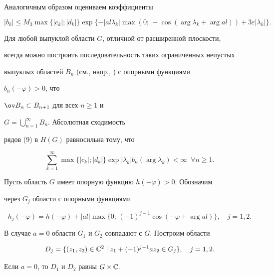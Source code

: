 Аналогичным образом оцениваем коэффициенты 


$$ 


|b_k|\le M_3\max\{|c_k|;|d_k|\}\exp 


\{-|al\lambda_k|\max(0;\,-\cos(\arg\lambda_k+\arg al))+ 


3\varepsilon|\lambda_k|\}. 


$$ 


 


Для любой выпуклой области $G$, отличной от расширенной плоскости, 


всегда можно построить последовательность таких ограниченных непустых 


выпуклых областей $B_n$ (см., напр., \cite{5}) с опорными функциями 


$b_n(-\varphi)>0$, что 


$\ov B_n\subset B_{n+1}$ для всех $n\ge 1$ и 


$G=\bigcup\limits^\infty_{n=1}B_n$. Абсолютная сходимость 


рядов (9) в $H(G)$ равносильна тому, что 


\begin{equation} 


\sum^\infty_{k=1}\max\{|c_k|;|d_k|\}\exp|\lambda_k| 


b_n(\arg\lambda_k)<\infty\ \; \forall n\ge 1. 


\end{equation} 


 


Пусть область $G$ имеет опорную функцию $h(-\varphi)>0$. Обозначим 


через $G_j$ области с опорными функциями 


$$ 


h_j(-\varphi)=h(-\varphi)+|al|\max 


\{0;\,(-1)^{j-1}\cos(-\varphi+\arg al)\},\quad j=1,2. 


$$ 


В случае $a=0$ области $G_1$ и $G_2$ совпадают с $G$. Построим области 


$$ 


D_j=\{(z_1,z_2)\in\Bbb C^2\mid z_1+(-1)^{j-1}a z_2\in G_j\}, 


\quad j=1,2. 


$$ 


Если $a=0$, то $D_1$ и $D_2$ равны $G\times\Bbb C$. 


